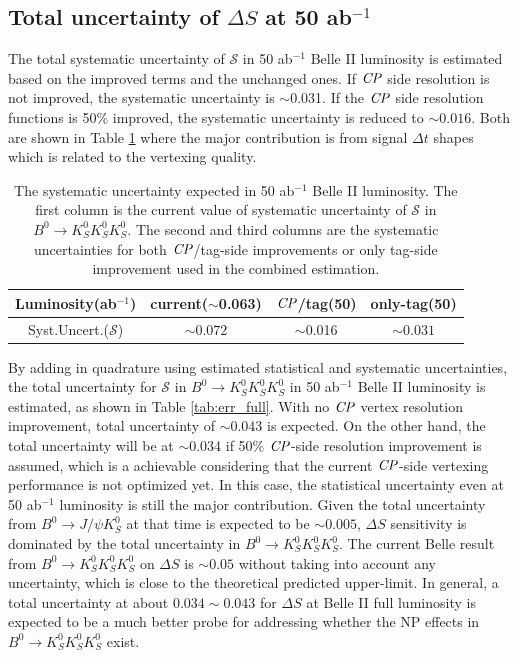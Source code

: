 \subsection{Total uncertainty of $\Delta S$ at 50 ab$^{-1}$}
The total systematic uncertainty of $\mathcal{S}$ in 50 ab$^{-1}$ Belle II luminosity is estimated based on the improved terms and the unchanged ones. If $\it{CP}$ side resolution is not improved, the systematic uncertainty is $\sim$0.031. If the $\it{CP}$ side resolution functions is 50\% improved, the systematic uncertainty is reduced to  $\sim0.016$. Both are shown in Table \ref{tab:sys_full} where the major contribution is from signal $\Delta t$ shapes which is related to the vertexing quality. 

\begin{table}[htpb]
	\centering
	\caption{The systematic uncertainty expected in 50 ab$^{-1}$ Belle II luminosity. The first column is the current value of systematic uncertainty of $\mathcal{S}$ in $B^0 \to K_S^0  K_S^0  K_S^0$. The second and third columns are the systematic uncertainties for both $\it{CP}$/tag-side improvements or only tag-side improvement used in the combined estimation.}
	\label{tab:sys_full}
	\begin{tabular}{c| c | c |c}
		\hline
		Luminosity(ab$^{-1}$) & current($\sim$0.063) & $\it{CP}$/tag(50)& only-tag(50)\\
		\hline
		Syst.Uncert.($\mathcal{S}$) & $\sim0.072$ & $\sim$0.016 & $\sim0.031$\\
		\hline
	\end{tabular}
\end{table}


By adding in quadrature using estimated statistical and systematic uncertainties, the total uncertainty for $\mathcal{S}$ in $B^0 \to K_S^0  K_S^0  K_S^0$ in 50 ab$^{-1}$ Belle II luminosity is estimated, as shown in Table \ref{tab:err_full}. With no $\it{CP}$ vertex resolution improvement, total uncertainty of $\sim 0.043$ is expected. On the other hand, the total uncertainty will be at $\sim 0.034$ if 50\% $\it{CP}$-side resolution improvement is assumed, which is a achievable considering that the current $\it{CP}$-side vertexing performance is not optimized yet. In this case, the statistical uncertainty even at 50 ab$^{-1}$ luminosity is still the major contribution. Given the total uncertainty from $B^0\to J/\psi K_S^0$ at that time is expected to be $\sim 0.005$\cite{b2book}, $\Delta S$ sensitivity is dominated by the total uncertainty in $B^0 \to K_S^0  K_S^0  K_S^0$. The current Belle result from $B^0 \to K_S^0  K_S^0  K_S^0$ on $\Delta S$ is $\sim0.05$ without taking into account any uncertainty, which is close to the theoretical predicted upper-limit. In general, a total uncertainty at about $0.034\sim 0.043$ for $\Delta S$ at Belle II full luminosity is expected to be a much better probe for addressing whether the NP effects in $B^0 \to K_S^0  K_S^0  K_S^0$ exist.

